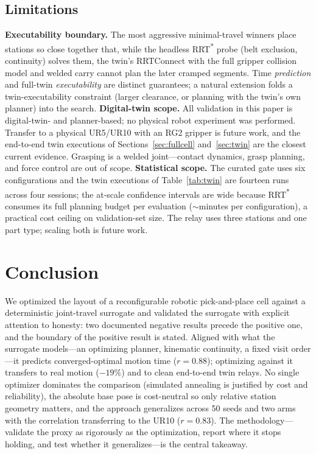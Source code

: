 \documentclass[conference]{IEEEtran}
\begin{document}
\subsection{Limitations}
\textbf{Executability boundary.} The most aggressive minimal-travel winners place stations so
close together that, while the headless RRT\textsuperscript{*} probe (belt exclusion,
continuity) solves them, the twin's RRTConnect with the full gripper collision model and welded
carry cannot plan the later cramped segments. Time \emph{prediction} and full-twin
\emph{executability} are distinct guarantees; a natural extension folds a twin-executability
constraint (larger clearance, or planning with the twin's own planner) into the search.
\textbf{Digital-twin scope.} All validation in this paper is digital-twin- and planner-based;
no physical robot experiment was performed. Transfer to a physical UR5/UR10 with an RG2 gripper
is future work, and the end-to-end twin executions of Sections~\ref{sec:fullcell}
and~\ref{sec:twin} are the closest current evidence. Grasping is a welded joint---contact
dynamics, grasp planning, and force control are out of scope. \textbf{Statistical scope.} The
curated gate uses six configurations and the twin executions of Table~\ref{tab:twin} are
fourteen runs across four sessions; the at-scale confidence intervals are wide because
RRT\textsuperscript{*} consumes its full planning budget per evaluation ($\sim$minutes per
configuration), a practical cost ceiling on validation-set size. The relay uses three stations
and one part type; scaling both is future work.

\section{Conclusion}
We optimized the layout of a reconfigurable robotic pick-and-place cell against a deterministic
joint-travel surrogate and validated the surrogate with explicit attention to honesty: two
documented negative results precede the positive one, and the boundary of the positive result is
stated. Aligned with what the surrogate models---an optimizing planner, kinematic continuity, a
fixed visit order---it predicts converged-optimal motion time ($r=0.88$); optimizing against it
transfers to real motion ($-19\%$) and to clean end-to-end twin relays. No single optimizer
dominates the comparison (simulated annealing is justified by cost and reliability), the
absolute base pose is cost-neutral so only relative station geometry matters, and the approach
generalizes across 50 seeds and two arms with the correlation transferring to the UR10
($r=0.83$). The methodology---validate the proxy as rigorously as the optimization, report where
it stops holding, and test whether it generalizes---is the central takeaway.
\end{document}
